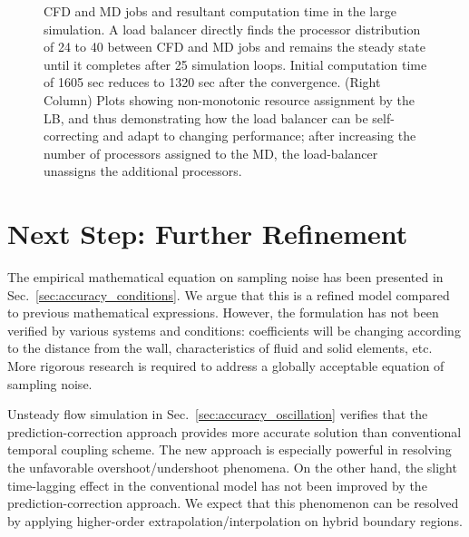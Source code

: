 \documentclass[preprint,12pt]{elsarticle}
\begin{document}
\begin{figure}
{  CFD and MD jobs and resultant computation time in the large
  simulation. A load balancer directly finds the processor
  distribution of 24 to 40 between CFD and MD jobs and remains the
  steady state until it completes after 25 simulation loops. Initial
  computation time of 1605 sec reduces to 1320 sec after the
  convergence. (Right Column) Plots showing non-monotonic resource
  assignment by the LB, and thus demonstrating how the load balancer
  can be self-correcting and adapt to changing performance; after
  increasing the number of processors assigned to the MD, the
  load-balancer unassigns the additional processors.}
\label{Fig:LBLarge}
\vspace{-1em}
\end{figure}



\section{Next Step: Further Refinement}
\label{sec:futureworks}

The empirical mathematical equation on sampling noise has been presented in Sec.~\ref{sec:accuracy_conditions}. We argue that this is a refined model compared to previous mathematical expressions. However, the formulation has not been verified by various systems and conditions: coefficients will be changing according to the distance from the wall, characteristics of fluid and solid elements, etc. More rigorous research is required to address a globally acceptable equation of sampling noise.

Unsteady flow simulation in Sec.~\ref{sec:accuracy_oscillation} verifies that the prediction-correction approach provides more accurate solution than conventional temporal coupling scheme. The new approach is especially powerful in resolving the unfavorable overshoot/undershoot phenomena. On the other hand, the slight time-lagging effect in the conventional model has not been improved by the prediction-correction approach. We expect that this phenomenon can be resolved by applying higher-order extrapolation/interpolation on hybrid boundary regions.
\end{document}
